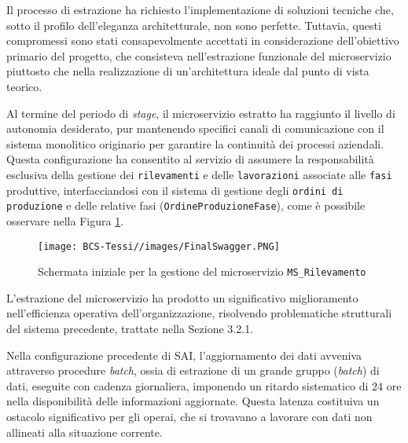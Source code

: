         \vspace{0.2 em}
        \noindent Il processo di estrazione ha richiesto l'implementazione di soluzioni tecniche che, sotto il profilo dell'eleganza architetturale, non sono perfette. Tuttavia, questi compromessi sono stati consapevolmente accettati in considerazione dell'obiettivo primario del progetto, che consisteva nell'estrazione funzionale del microservizio piuttosto che nella realizzazione di un'architettura ideale dal punto di vista teorico.

        \vspace{0.2 em}
        \noindent Al termine del periodo di \textit{stage}, il microservizio estratto ha raggiunto il livello di autonomia desiderato, pur mantenendo specifici canali di comunicazione con il sistema monolitico originario per garantire la continuità dei processi aziendali. Questa configurazione ha consentito al servizio di assumere la responsabilità esclusiva della gestione dei \texttt{rilevamenti} e delle \texttt{lavorazioni} associate alle \texttt{fasi} produttive, interfacciandosi con il sistema di gestione degli \texttt{ordini di produzione} e delle relative fasi (\texttt{OrdineProduzioneFase}), come è possibile osservare nella Figura \ref{fig:final-Swagger}.
        
        \begin{figure}[H]
            \centering
            \texttt{[image: BCS-Tessi//images/FinalSwagger.PNG]}
            \caption{Schermata iniziale per la gestione del microservizio \texttt{MS\_Rilevamento}}
            \label{fig:final-Swagger}
        \end{figure}

        \vspace{0.2 em}
        \noindent L'estrazione del microservizio ha prodotto un significativo miglioramento nell'efficienza operativa dell'organizzazione, risolvendo problematiche strutturali del sistema precedente, trattate nella Sezione 3.2.1. 

        \vspace{0.2 em}
        \noindent Nella configurazione precedente di SAI, l'aggiornamento dei dati avveniva attraverso procedure \textit{batch}, ossia di estrazione di un grande gruppo (\textit{batch}) di dati, eseguite con cadenza giornaliera, imponendo un ritardo sistematico di 24 ore nella disponibilità delle informazioni aggiornate. Questa latenza costituiva un ostacolo significativo per gli operai, che si trovavano a lavorare con dati non allineati alla situazione corrente.

